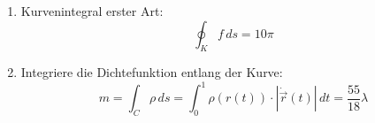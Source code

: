 \begin{enumerate}
\begin{enumerate}
                    Länge der Flugbahn: \(L\approx 16.23\)

          \end{enumerate}
    \item Kurvenintegral erster Art:  \[ \oint_K f\, ds = 10\pi \]
    \item Integriere die Dichtefunktion entlang der Kurve:
          \[m = \int_C \rho \, ds = \int_0^1 \rho(r(t)) \cdot  |\dot{\vec{r}}(t)| \, dt = \frac{55}{18}\lambda\]
\end{enumerate}